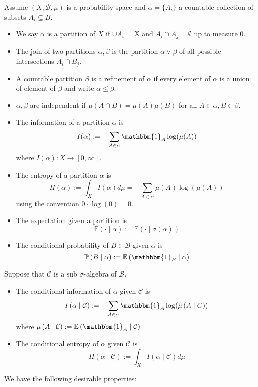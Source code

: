 \documentclass[11pt]{article}
\newcommand{\defeq}{:=}
\newcommand{\msrspc}{\ensuremath{(X,\mathcal{B},\mu)}}
\newcommand{\indic}[1]{\mathbbm{1}_{#1}}
\newcommand{\gvn}[2]{\ensuremath{\left(#1\;|\;#2\right)}}
\newcommand{\expg}[2]{\ensuremath{\mathbb{E}\gvn{#1}{#2}}}
\newcommand{\infog}[2]{\ensuremath{I\gvn{#1}{#2}}}
\newcommand{\entrg}[2]{\ensuremath{H\gvn{#1}{#2}}}
\newcommand{\probg}[2]{\ensuremath{\mathbb{P}\gvn{#1}{#2}}}
\newenvironment{defin}
	{\begin{mdframed}[backgroundcolor=white, roundcorner=5pt, linewidth=1pt]}
	{\end{mdframed}}
\newcommand{\mdf}[1]{{\color{red} #1}}
\begin{document}
\begin{defin}
Assume $\msrspc$ is a probability space and $\alpha=\{A_i\}$ a countable collection of subsets $A_i\subseteq B$.
\begin{itemize}
	\item We say $\alpha$ is a \mdf{partition} of $X$ if $\cup A_i$ = X and $A_i\cap A_j=\emptyset$ up to measure 0.
	\item The \mdf{join} of two partitions $\alpha,\beta$ is the partition $\alpha\vee\beta$ of all possible intersections $A_i\cap B_j$.
	\item A countable partition $\beta$ is a \mdf{refinement} of $\alpha$ if every element of $\alpha$ is a union of element of $\beta$ and write $\alpha\leq\beta$.
	\item $\alpha,\beta$ are \mdf{independent} if $\mu(A\cap B)=\mu(A)\mu(B)$ for all $A\in\alpha, B\in\beta$.
	\item The \mdf{information of a partition} $\alpha$ is
		$$I(\alpha)\defeq-\sum_{A\in\alpha}\indic{A}\log(\mu(A))$$
		where $I(\alpha):X\to[0,\infty]$.
	\item The \mdf{entropy of a partition} $\alpha$ is
		$$H(\alpha)\defeq\int_X I(\alpha)d\mu=-\sum_{A\in\alpha}\mu(A)\log(\mu(A))$$
		using the convention $0\cdot\log(0)=0$.
	\item The \mdf{expectation given a partition} is
		$$\expg{\cdot}{\alpha}\defeq\expg{\cdot}{\sigma(\alpha)}$$
	\item The \mdf{conditional probability} of $B\in\mathcal{B}$ given $\alpha$ is
		$$\probg{B}{\alpha}\defeq\expg{\indic{B}}{\alpha}$$
\end{itemize}
Suppose that $\mathcal{C}$ is a sub $\sigma$-algebra of $\mathcal{B}$.
\begin{itemize}
	\item The \mdf{conditional information of $\alpha$ given $\mathcal{C}$} is
		$$\infog{\alpha}{\mathcal{C}}\defeq - \sum_{A\in\alpha}\indic{A}\log(\mu\gvn{A}{C})$$
	where $\mu\gvn{A}{\mathcal{C}}\defeq\expg{\indic{A}}{\mathcal{C}}$
	\item The \mdf{conditional entropy of $\alpha$ given $\mathcal{C}$} is
			$$\entrg{\alpha}{\mathcal{C}}\defeq\int_X\infog{\alpha}{\mathcal{C}}d\mu$$	
\end{itemize}
\end{defin}
We have the following desirable properties:
\end{document}
